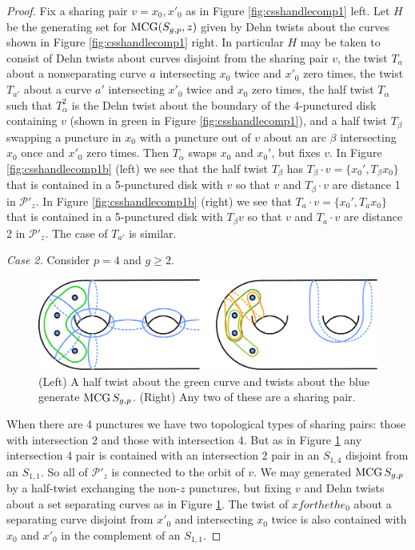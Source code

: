 \begin{proof}
  Fix a sharing pair $v={x_0,x'_0}$ as in Figure \ref{fig:csshandlecomp1} left.
  Let $H$ be the generating set for $\operatorname{MCG} (S_{g,p},z)$ given by Dehn twists about the curves shown
  in Figure \ref{fig:csshandlecomp1} right.
  In particular $H$ may be taken to consist of Dehn twists about curves disjoint from
  the sharing pair $v$,
  the twist $T_a$ about a nonseparating curve $a$ intersecting $x_0$ twice and $x'_0$ zero times,
  the twist $T_{a'}$ about a curve $a'$ intersecting $x'_0$ twice and $x_0$ zero times,
  the half twist $T_\alpha$ such that $T^2_\alpha$ is the Dehn twist about the boundary of the 4-punctured disk containing $v$
  (shown in green in Figure \ref{fig:csshandlecomp1}),
  and a half twist $T_\beta$ swapping a puncture in $x_0$
  with a puncture out of $v$
  about an arc $\beta$ intersecting $x_0$ once and $x'_0$ zero times.
  Then $T_\alpha$ swaps $x_0$ and $x_0'$, but fixes $v$.
  In Figure \ref{fig:csshandlecomp1b} (left) we see that
  the half twist $T_\beta$ has $T_\beta \cdot v = \{x_0', T_\beta x_0 \}$
  that is contained in a 5-punctured disk with $v$ so that $v$
  and $T_\beta \cdot v$ are distance 1 in $\mathcal P'_z$.
  In Figure \ref{fig:csshandlecomp1b} (right) we see that
  $T_a \cdot v = \{x_0', T_a x_0 \}$
  that is contained in a 5-punctured disk with $T_\beta v$ so that $v$
  and $T_a \cdot v$ are distance 2 in $\mathcal P'_z$.
  The case of $T_{a'}$ is similar.



  \emph{Case 2.} Consider $p=4$ and $g \geq 2$.

  \begin{figure}[h!]
    \centering
    \includegraphics[width=.8\textwidth]{figures/handlecompliment2.pdf}
    \caption{(Left) A half twist about the green curve and twists about the blue generate $\operatorname{MCG} S_{g,p}$. (Right) Any two of these are a sharing pair.}
    \label{fig:csshandlecomp2}
  \end{figure}

  When there are 4 punctures we have two topological types of sharing pairs:
  those with intersection 2 and those with intersection 4.
  But as in Figure \ref{fig:csshandlecomp2}
  any intersection 4 pair is contained with an intersection 2 pair in an $S_{1,4}$
  disjoint from an $S_{1,1}$.
  So all of $\mathcal P'_z$ is connected to the orbit of $v$.
  We may generated $\operatorname{MCG} S_{g,p}$ by a half-twist exchanging the non-$z$ punctures, but fixing $v$
  and Dehn twists about a set separating curves as in Figure \ref{fig:csshandlecomp2}.
  The twist of $xfor the the_0$ about a separating curve disjoint from $x'_0$ and intersecting $x_0$ twice
  is also contained with $x_0$ and $x'_0$ in the complement of an $S_{1,1}$.



\end{proof}
